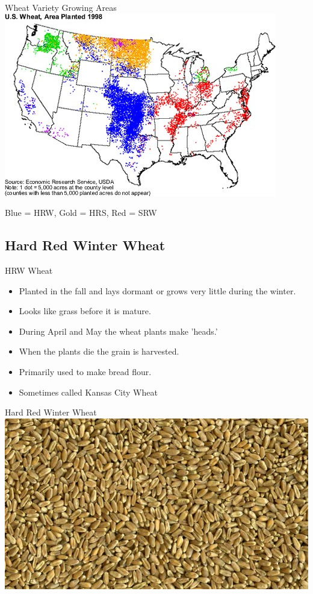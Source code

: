 \documentclass{beamer}
\begin{document}
\begin{frame}{Wheat Variety Growing Areas}
\includegraphics[width=.75\textwidth]{Wheat-Growing-Areas.jpg}

Blue = HRW, Gold = HRS, Red  = SRW
\end{frame}

\subsection{Hard Red Winter Wheat}

\begin{frame}[<+-| alert@+>]{HRW Wheat}
\begin{itemize}
\item Planted in the fall and lays dormant or grows very little during the winter.
\item Looks like grass before it is mature.
\item During April and May the wheat plants make 'heads.'
\item When the plants die the grain is harvested.
\item Primarily used to make bread flour.
\item Sometimes called Kansas City Wheat
\end{itemize}
\end{frame}
  
\begin{frame}{Hard Red Winter Wheat}
\includegraphics[width=.75\textwidth]{HRW-Wheat.jpg}
\end{frame}
\end{document}
